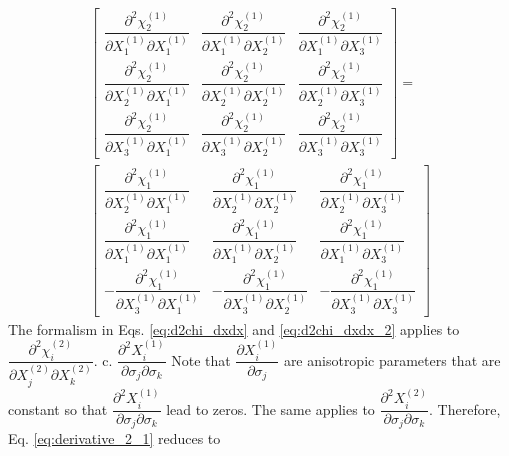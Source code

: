\documentclass[12pt]{amsart}
\begin{document}
\begin{equation}
  \label{eq:d2chi_dxdx_2}
  \begin{split}
    \begin{bmatrix}
      \dfrac{\partial^2\chi^{(1)}_2}{\partial X^{(1)}_1\partial X^{(1)}_1}&\dfrac{\partial^2\chi^{(1)}_2}{\partial X^{(1)}_1\partial X^{(1)}_2}&\dfrac{\partial^2\chi^{(1)}_2}{\partial X^{(1)}_1\partial X^{(1)}_3}\\
      \dfrac{\partial^2\chi^{(1)}_2}{\partial X^{(1)}_2\partial X^{(1)}_1}&\dfrac{\partial^2\chi^{(1)}_2}{\partial X^{(1)}_2\partial X^{(1)}_2}&\dfrac{\partial^2\chi^{(1)}_2}{\partial X^{(1)}_2\partial X^{(1)}_3}\\
      \dfrac{\partial^2\chi^{(1)}_2}{\partial X^{(1)}_3\partial X^{(1)}_1}&\dfrac{\partial^2\chi^{(1)}_2}{\partial X^{(1)}_3\partial X^{(1)}_2}&\dfrac{\partial^2\chi^{(1)}_2}{\partial X^{(1)}_3\partial X^{(1)}_3}
    \end{bmatrix}
    =\\
    \begin{bmatrix}
      \dfrac{\partial^2\chi^{(1)}_1}{\partial X^{(1)}_2\partial X^{(1)}_1}&\dfrac{\partial^2\chi^{(1)}_1}{\partial X^{(1)}_2\partial X^{(1)}_2}&\dfrac{\partial^2\chi^{(1)}_1}{\partial X^{(1)}_2\partial X^{(1)}_3}\\
      \dfrac{\partial^2\chi^{(1)}_1}{\partial X^{(1)}_1\partial X^{(1)}_1}&\dfrac{\partial^2\chi^{(1)}_1}{\partial X^{(1)}_1\partial X^{(1)}_2}&\dfrac{\partial^2\chi^{(1)}_1}{\partial X^{(1)}_1\partial X^{(1)}_3}\\
      -\dfrac{\partial^2\chi^{(1)}_1}{\partial X^{(1)}_3\partial X^{(1)}_1}&-\dfrac{\partial^2\chi^{(1)}_1}{\partial X^{(1)}_3\partial X^{(1)}_2}&-\dfrac{\partial^2\chi^{(1)}_1}{\partial X^{(1)}_3\partial X^{(1)}_3}
    \end{bmatrix}
  \end{split}
\end{equation}
The formalism in Eqs. \ref{eq:d2chi_dxdx} and \ref{eq:d2chi_dxdx_2} applies to $\dfrac{\partial^2\chi_i^{(2)}}{\partial X_j^{(2)} \partial X_k^{(2)}}$.
c. $\dfrac{\partial^2 X^{(1)}_i}{\partial\sigma_j\partial\sigma_k}$
Note that $\dfrac{\partial X^{(1)}_i}{\partial\sigma_j}$ are anisotropic parameters that are constant so that $\dfrac{\partial^2 X^{(1)}_i}{\partial\sigma_j\partial\sigma_k}$ lead to zeros.
The same applies to $\dfrac{\partial^2 X^{(2)}_i}{\partial\sigma_j\partial\sigma_k}$.
Therefore, Eq. \ref{eq:derivative_2_1} reduces to
\end{document}
